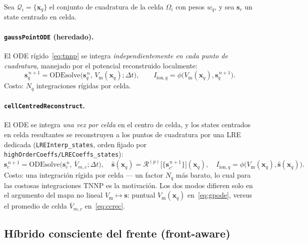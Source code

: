\documentclass[11pt,a4paper]{article}
\newcommand{\code}[1]{\texttt{\small #1}}
\newcommand{\Vm}{V_{\text{m}}}
\newcommand{\Iionsub}[1]{I_{\mathrm{ion},#1}}
\newcommand{\dictkey}[1]{\textcolor{black!60!green}{\texttt{\footnotesize #1}}}
\begin{document}
Sea $\mathcal{Q}_i=\{\mathbf{x}_q\}$ el conjunto de cuadratura de la celda
$\Omega_i$ con pesos $w_q$, y sea $\mathbf{s}_c$ un state centrado en celda.

\paragraph{\code{gaussPointODE} (heredado).}
El ODE rígido~\eqref{eq:tnnp} se integra \emph{independientemente en cada punto de
cuadratura}, manejado por el potencial reconstruido localmente:
\begin{equation}
  \mathbf{s}_q^{\,n+1}
   = \mathrm{ODEsolve}\!\bigl(\mathbf{s}_q^{\,n},\,\Vm(\mathbf{x}_q);\Delta t\bigr),
  \qquad
  \Iionsub{q}=\phi\bigl(\Vm(\mathbf{x}_q),\mathbf{s}_q^{\,n+1}\bigr).
  \label{eq:gpode}
\end{equation}
Costo: $N_q$ integraciones rígidas por celda.

\paragraph{\code{cellCentredReconstruct}.}
El ODE se integra \emph{una vez por celda} en el centro de celda, y los states
centrados en celda resultantes se reconstruyen a los puntos de cuadratura por una
LRE dedicada (\code{LREInterp\_states}, orden fijado por
\dictkey{highOrderCoeffs/LRECoeffs\_states}):
\begin{equation}
  \mathbf{s}_c^{\,n+1}
   = \mathrm{ODEsolve}\!\bigl(\mathbf{s}_c^{\,n},\,\overline{V}_{m,c};\Delta t\bigr),
  \quad
  \widehat{\mathbf{s}}(\mathbf{x}_q)
   = \mathcal{R}^{(p)}\!\bigl[\{\mathbf{s}_{c'}^{\,n+1}\}\bigr](\mathbf{x}_q),
  \quad
  \Iionsub{q}=\phi\bigl(\Vm(\mathbf{x}_q),\widehat{\mathbf{s}}(\mathbf{x}_q)\bigr).
  \label{eq:ccrec}
\end{equation}
Costo: una integración rígida por celda --- un factor $N_q$ más barato, lo cual
para las costosas integraciones TNNP es la motivación. Los dos modos difieren solo
en el argumento del mapa no lineal $\Vm\!\mapsto\!\mathbf{s}$: puntual
$\Vm(\mathbf{x}_q)$ en~\eqref{eq:gpode}, versus el promedio de celda
$\overline{V}_{m,c}$ en~\eqref{eq:ccrec}.

\subsection{Híbrido consciente del frente (front-aware)}
\label{sec:hybrid}
\end{document}
